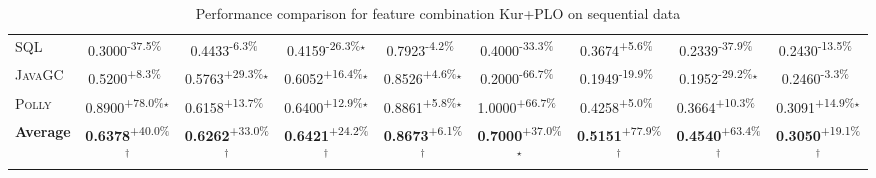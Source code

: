 \begin{table}[htbp]
\begin{tabular}{l|cccc|cccc}
\textsc{SQL} & \cellcolor{red!30}0.3000\textsuperscript{-37.5\%}$^{\,\,\,}$ & \cellcolor{red!30}0.4433\textsuperscript{-6.3\%}$^{\,\,\,}$ & \cellcolor{red!30}0.4159\textsuperscript{-26.3\%}$^\star$ & \cellcolor{red!30}0.7923\textsuperscript{-4.2\%}$^{\,\,\,}$ & \cellcolor{red!30}0.4000\textsuperscript{-33.3\%}$^{\,\,\,}$ & \cellcolor{green!30}0.3674\textsuperscript{+5.6\%}$^{\,\,\,}$ & \cellcolor{red!30}0.2339\textsuperscript{-37.9\%}$^{\,\,\,}$ & \cellcolor{red!30}0.2430\textsuperscript{-13.5\%}$^{\,\,\,}$ \\
\textsc{JavaGC} & \cellcolor{green!30}0.5200\textsuperscript{+8.3\%}$^{\,\,\,}$ & \cellcolor{green!30}0.5763\textsuperscript{+29.3\%}$^\star$ & \cellcolor{green!30}0.6052\textsuperscript{+16.4\%}$^\star$ & \cellcolor{green!30}0.8526\textsuperscript{+4.6\%}$^\star$ & \cellcolor{red!30}0.2000\textsuperscript{-66.7\%}$^{\,\,\,}$ & \cellcolor{red!30}0.1949\textsuperscript{-19.9\%}$^{\,\,\,}$ & \cellcolor{red!30}0.1952\textsuperscript{-29.2\%}$^\star$ & \cellcolor{red!30}0.2460\textsuperscript{-3.3\%}$^{\,\,\,}$ \\
\textsc{Polly} & \cellcolor{green!30}0.8900\textsuperscript{+78.0\%}$^\star$ & \cellcolor{green!30}0.6158\textsuperscript{+13.7\%}$^{\,\,\,}$ & \cellcolor{green!30}0.6400\textsuperscript{+12.9\%}$^\star$ & \cellcolor{green!30}0.8861\textsuperscript{+5.8\%}$^\star$ & \cellcolor{green!30}1.0000\textsuperscript{+66.7\%}$^{\,\,\,}$ & \cellcolor{green!30}0.4258\textsuperscript{+5.0\%}$^{\,\,\,}$ & \cellcolor{green!30}0.3664\textsuperscript{+10.3\%}$^{\,\,\,}$ & \cellcolor{green!30}0.3091\textsuperscript{+14.9\%}$^\star$ \\
\hline
\textbf{Average} & \cellcolor{green!30}\textbf{0.6378}\textsuperscript{+40.0\%}$^\dagger$ & \cellcolor{green!30}\textbf{0.6262}\textsuperscript{+33.0\%}$^\dagger$ & \cellcolor{green!30}\textbf{0.6421}\textsuperscript{+24.2\%}$^\dagger$ & \cellcolor{green!30}\textbf{0.8673}\textsuperscript{+6.1\%}$^\dagger$ & \cellcolor{green!30}\textbf{0.7000}\textsuperscript{+37.0\%}$^\star$ & \cellcolor{green!30}\textbf{0.5151}\textsuperscript{+77.9\%}$^\dagger$ & \cellcolor{green!30}\textbf{0.4540}\textsuperscript{+63.4\%}$^\dagger$ & \cellcolor{green!30}\textbf{0.3050}\textsuperscript{+19.1\%}$^\dagger$ \\
\hline
\end{tabular}
\caption{Performance comparison for feature combination Kur+PLO on sequential data}
\label{tab:combo_Kur_PLO_performance_sequential}
\end{table}